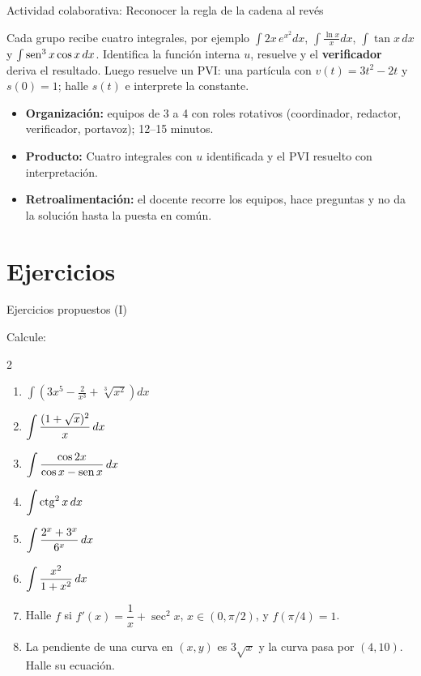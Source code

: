 \documentclass[10pt,aspectratio=169]{beamer}
\begin{document}
\begin{frame}{Actividad colaborativa: Reconocer la regla de la cadena al revés}
  \small
  \begin{activa}
    Cada grupo recibe cuatro integrales, por ejemplo $\int2x\,e^{x^2}dx$, $\int\frac{\ln x}{x}dx$, $\int\tan x\,dx$ y $\int\operatorname{sen}^3x\cos x\,dx$. Identifica la función interna $u$, resuelve y el \textbf{verificador} deriva el resultado. Luego resuelve un PVI: una partícula con $v(t)=3t^2-2t$ y $s(0)=1$; halle $s(t)$ e interprete la constante.
  \end{activa}
  \begin{itemize}
    \item \textbf{Organización:} equipos de 3 a 4 con roles rotativos (coordinador, redactor, verificador, portavoz); 12--15 minutos.
    \item \textbf{Producto:} Cuatro integrales con $u$ identificada y el PVI resuelto con interpretación.
    \item \textbf{Retroalimentación:} el docente recorre los equipos, hace preguntas y no da la solución hasta la puesta en común.
  \end{itemize}
\end{frame}

\section{Ejercicios}

\begin{frame}{Ejercicios propuestos (I)}
  \begin{ejercicio}
    Calcule:
    \begin{multicols}{2}
\begin{enumerate}
          \item $\displaystyle\int\left(3x^5-\frac{2}{x^3}+\sqrt[3]{x^2}\right)dx$
          \item $\displaystyle\int\frac{(1+\sqrt{x})^2}{x}\,dx$
          \item $\displaystyle\int\frac{\cos 2x}{\cos x-\operatorname{sen} x}\,dx$
          \item $\displaystyle\int\operatorname{ctg}^2x\,dx$
          \item $\displaystyle\int\frac{2^x+3^x}{6^x}\,dx$
          \item $\displaystyle\int\frac{x^2}{1+x^2}\,dx$
\end{enumerate}
\end{multicols}
  \end{ejercicio}
  \begin{ejercicio}
    \begin{enumerate}
      \setcounter{enumi}{6}
      \item Halle $f$ si $f'(x)=\dfrac{1}{x}+\sec^2x$, $x\in(0,\pi/2)$, y $f(\pi/4)=1$.
      \item La pendiente de una curva en $(x,y)$ es $3\sqrt{x}$ y la curva pasa por $(4,10)$. Halle su ecuación.
    \end{enumerate}
  \end{ejercicio}
\end{frame}
\end{document}
